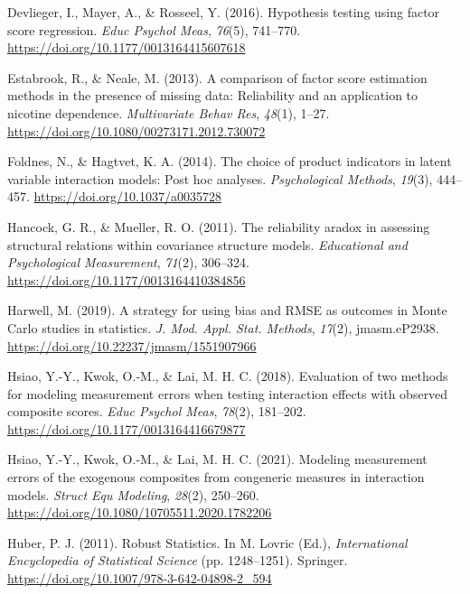 \documentclass[
  man]{apa6}
\newlength{\cslhangindent}
\newenvironment{CSLReferences}[2] %
 {\begin{list}{}{%
  \setlength{\itemindent}{0pt}
  \setlength{\leftmargin}{0pt}
  \setlength{\parsep}{0pt}
  \ifodd #1
   \setlength{\leftmargin}{\cslhangindent}
   \setlength{\itemindent}{-1\cslhangindent}
  \fi
  \setlength{\itemsep}{#2\baselineskip}}}
 {\end{list}}
\begin{document}
\begin{CSLReferences}{1}{0}
Devlieger, I., Mayer, A., \& Rosseel, Y. (2016). Hypothesis testing using factor score regression. \emph{Educ Psychol Meas}, \emph{76}(5), 741--770. \url{https://doi.org/10.1177/0013164415607618}

Estabrook, R., \& Neale, M. (2013). A comparison of factor score estimation methods in the presence of missing data: {Reliability} and an application to nicotine dependence. \emph{Multivariate Behav Res}, \emph{48}(1), 1--27. \url{https://doi.org/10.1080/00273171.2012.730072}

Foldnes, N., \& Hagtvet, K. A. (2014). The choice of product indicators in latent variable interaction models: {Post} hoc analyses. \emph{Psychological Methods}, \emph{19}(3), 444--457. \url{https://doi.org/10.1037/a0035728}

Hancock, G. R., \& Mueller, R. O. (2011). The reliability aradox in assessing structural relations within covariance structure models. \emph{Educational and Psychological Measurement}, \emph{71}(2), 306--324. \url{https://doi.org/10.1177/0013164410384856}

Harwell, M. (2019). A strategy for using bias and {RMSE} as outcomes in {Monte Carlo} studies in statistics. \emph{J. Mod. Appl. Stat. Methods}, \emph{17}(2), jmasm.eP2938. \url{https://doi.org/10.22237/jmasm/1551907966}

Hsiao, Y.-Y., Kwok, O.-M., \& Lai, M. H. C. (2018). Evaluation of two methods for modeling measurement errors when testing interaction effects with observed composite scores. \emph{Educ Psychol Meas}, \emph{78}(2), 181--202. \url{https://doi.org/10.1177/0013164416679877}

Hsiao, Y.-Y., Kwok, O.-M., \& Lai, M. H. C. (2021). Modeling measurement errors of the exogenous composites from congeneric measures in interaction models. \emph{Struct Equ Modeling}, \emph{28}(2), 250--260. \url{https://doi.org/10.1080/10705511.2020.1782206}

Huber, P. J. (2011). Robust {Statistics}. In M. Lovric (Ed.), \emph{International {Encyclopedia} of {Statistical Science}} (pp. 1248--1251). Springer. \url{https://doi.org/10.1007/978-3-642-04898-2_594}


\end{CSLReferences}
\end{document}
